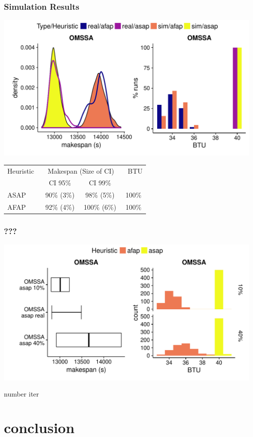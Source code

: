 \documentclass{beamer}
\begin{document}
\begin{frame}
	\frametitle{Simulation Results}
	\begin{center}
	\includegraphics[height=0.6\textheight]{gfx/fit.pdf}\\
	{\small
	\begin{tabular}{lccc}
		\toprule
		Heuristic~&\multicolumn{2}{c}{~Makespan (Size of
		CI)~}&~BTU\\
		 & CI 95\% & CI 99\% &\\
		\midrule
		ASAP& 90\% (3\%)& 98\% (5\%)& 100\%\\
		AFAP& 92\% (4\%)& 100\% (6\%)& 100\%\\
		\bottomrule
	\end{tabular}
	}
	\end{center}
\end{frame}

\begin{frame}
	\frametitle{???}
	\includegraphics[width=\textwidth]{gfx/int.pdf}
\end{frame}

\begin{frame}
	number iter
\end{frame}
\section{conclusion}
\end{document}
